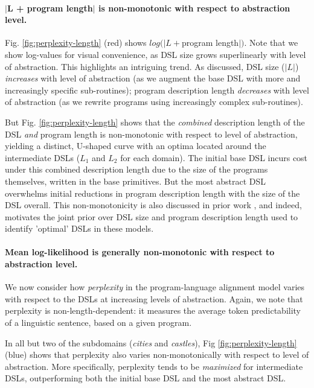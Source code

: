\documentclass[10pt,letterpaper]{article}
\begin{document}
\paragraph{$|$L + program length$|$ is non-monotonic with respect to abstraction level.} Fig. \ref{fig:perplexity-length} (red) shows $log(|L + $program length$|)$. Note that we show log-values for visual convenience, as DSL size grows superlinearly with level of abstraction. This highlights an intriguing trend. As discussed, DSL size ($|L|$) \textit{increases} with level of abstraction (as we augment the base DSL with more and increasingly specific sub-routines); program description length \textit{decreases} with level of abstraction (as we rewrite programs using increasingly complex sub-routines).

But Fig. \ref{fig:perplexity-length} shows that the \textit{combined} description length of the DSL \textit{and} program length is non-monotonic with respect to level of abstraction, yielding a distinct, U-shaped curve with an optima located around the intermediate DSLs ($L_1$ and $L_2$ for each domain). The initial base DSL incurs cost under this combined description length due to the size of the programs themselves, written in the base primitives. But the most abstract DSL overwhelms initial reductions in program description length with the size of the DSL overall. This non-monotonicity is also discussed in prior work , and indeed, motivates the joint prior over DSL size and program description length used to identify 'optimal' DSLs in these models.

\paragraph{Mean log-likelihood is generally non-monotonic with respect to abstraction level.} We now consider how \textit{perplexity} in the program-language alignment model varies with respect to the DSLs at increasing levels of abstraction. Again, we note that perplexity is non-length-dependent: it measures the average token predictability of a linguistic sentence, based on a given program. 

In all but two of the subdomains (\textit{cities} and \textit{castles}), Fig \ref{fig:perplexity-length} (blue) shows that perplexity also varies non-monotonically with respect to level of abstraction. More specifically, perplexity tends to be \textit{maximized} for intermediate DSLs, outperforming both the initial base DSL and the most abstract DSL.
\end{document}
